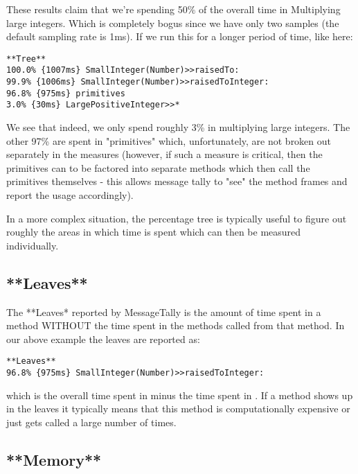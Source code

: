 \documentclass[a4paper,10pt,twoside]{book}
\begin{document}
These results claim that we're spending 50\% of the overall time in
Multiplying large integers. Which is completely bogus since we have only
two samples (the default sampling rate is 1ms). If we run this for a
longer period of time, like here:


\begin{verbatim}
**Tree**
100.0% {1007ms} SmallInteger(Number)>>raisedTo:
99.9% {1006ms} SmallInteger(Number)>>raisedToInteger:
96.8% {975ms} primitives
3.0% {30ms} LargePositiveInteger>>*
\end{verbatim}

We see that indeed, we only spend roughly 3\% in multiplying large
integers. The other 97\% are spent in "primitives" which, unfortunately,
are not broken out separately in the measures (however, if such a
measure is critical, then the primitives can to be factored into
separate methods which then call the primitives themselves - this allows
message tally to "see" the method frames and report the usage accordingly).

In a more complex situation, the percentage tree is typically useful to
figure out roughly the areas in which time is spent which can then be
measured individually.

 \subsection{**Leaves**}


The **Leaves* reported by MessageTally is the amount of time spent in a
method WITHOUT the time spent in the methods called from that method. In
our above example the leaves are reported as:

\begin{verbatim}
**Leaves**
96.8% {975ms} SmallInteger(Number)>>raisedToInteger:
\end{verbatim}

which is the overall time spent in 
minus the time spent in . If a method
shows up in the leaves it typically means that this method is
computationally expensive or just gets called a large number of times.

 \subsection{**Memory**}
\end{document}
